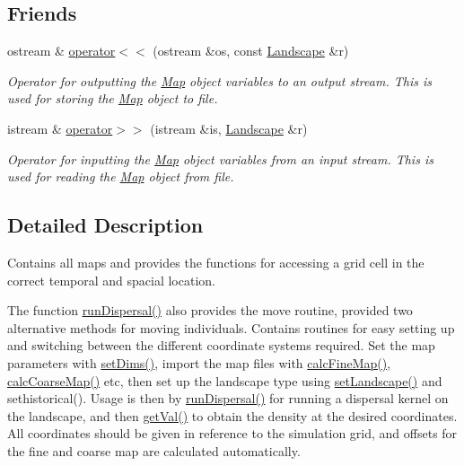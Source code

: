 \subsection*{Friends}
\begin{DoxyCompactItemize}
\item 
ostream \& \hyperlink{class_landscape_a1c309185f0c3a601f27c932f1f2fa886}{operator$<$$<$} (ostream \&os, const \hyperlink{class_landscape}{Landscape} \&r)
\begin{DoxyCompactList}\small\item\em Operator for outputting the \hyperlink{class_map}{Map} object variables to an output stream. This is used for storing the \hyperlink{class_map}{Map} object to file. \end{DoxyCompactList}\item 
istream \& \hyperlink{class_landscape_a8b9beb241ad534346dc98d24f6bb9279}{operator$>$$>$} (istream \&is, \hyperlink{class_landscape}{Landscape} \&r)
\begin{DoxyCompactList}\small\item\em Operator for inputting the \hyperlink{class_map}{Map} object variables from an input stream. This is used for reading the \hyperlink{class_map}{Map} object from file. \end{DoxyCompactList}\end{DoxyCompactItemize}


\subsection{Detailed Description}
Contains all maps and provides the functions for accessing a grid cell in the correct temporal and spacial location. 

The function \hyperlink{class_landscape_aedc33de89997456d53cceb3e4e424e64}{run\+Dispersal()} also provides the move routine, provided two alternative methods for moving individuals. Contains routines for easy setting up and switching between the different coordinate systems required. Set the map parameters with \hyperlink{class_landscape_acc47e50bdad6af7f2bbed57db73f6730}{set\+Dims()}, import the map files with \hyperlink{class_landscape_ad500af94a2afd577e682b3c042cab217}{calc\+Fine\+Map()}, \hyperlink{class_landscape_a2b34dcd828e0006dde9e60315cbddac8}{calc\+Coarse\+Map()} etc, then set up the landscape type using \hyperlink{class_landscape_a63150f634d7936439bc5a1d20b84a7b2}{set\+Landscape()} and sethistorical(). Usage is then by \hyperlink{class_landscape_aedc33de89997456d53cceb3e4e424e64}{run\+Dispersal()} for running a dispersal kernel on the landscape, and then \hyperlink{class_landscape_a06dbce690810d8d771490c310cb96310}{get\+Val()} to obtain the density at the desired coordinates. All coordinates should be given in reference to the simulation grid, and offsets for the fine and coarse map are calculated automatically. 

